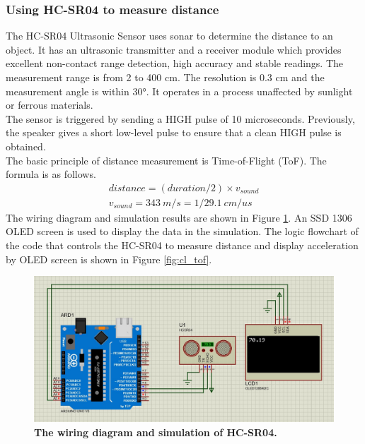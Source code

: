 \subsubsection{Using HC-SR04 to measure distance}
The HC-SR04 Ultrasonic Sensor uses sonar to determine the distance to an object. It has an ultrasonic 
transmitter and a receiver module which provides excellent non-contact range detection, high accuracy and 
stable readings. The measurement range is from 2 to 400 cm. The resolution is 0.3 cm and the measurement angle 
is within 30°. It operates in a process unaffected by sunlight or ferrous materials. \\
The sensor is triggered by sending a HIGH pulse of 10 microseconds. Previously, the speaker gives a short 
low-level pulse to ensure that a clean HIGH pulse is obtained. \\
The basic principle of distance measurement is Time-of-Flight (ToF). The formula is as follows.
\begin{align}
    distance = (duration/2) \times v_{sound} \\
    v_{sound} = 343\ m/s = 1/29.1\ cm/us \nonumber
\end{align}
\noindent The wiring diagram and simulation results are shown in Figure \ref{fig:tof}. An SSD 1306 OLED screen 
is used to display the data in the simulation. The logic flowchart of the code that controls the HC-SR04 to measure 
distance and display acceleration by OLED screen is shown in Figure \ref{fig:cl_tof}.
\begin{figure}[H] %
    \centering 
    \captionsetup{labelsep=colon}
    \includegraphics[width=0.8\linewidth]{Image/Design/tof_circuit.jpg}
    \caption[The wiring diagram and simulation of HC-SR04]
    {\centering \textbf{The wiring diagram and simulation of HC-SR04.}}
    \label{fig:tof}
\end{figure}
